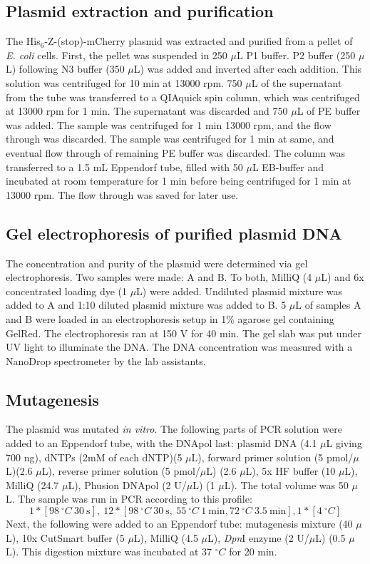 \documentclass[11pt,a4paper]{article}
\begin{document}
\subsection{Plasmid extraction and purification}
The His$_6$-Z-(stop)-mCherry plasmid was extracted and purified from a pellet of \textit{E. coli} cells. First, the pellet was suspended in 250 $\mu$L P1 buffer. P2 buffer (250 $\mu$L) following N3 buffer (350 $\mu$L) was added and inverted after each addition. This solution was centrifuged for 10 min at 13000 rpm. 750 $\mu$L of the supernatant from the tube was transferred to a QIAquick spin column, which was centrifuged at 13000 rpm for 1 min. The supernatant was discarded and 750 $\mu$L of PE buffer was added. The sample was centrifuged for 1 min 13000 rpm, and the flow through was discarded. The sample was centrifuged for 1 min at same, and eventual flow through of remaining PE buffer was discarded. The column was transferred to a 1.5 mL Eppendorf tube, filled with 50 $\mu$L EB-buffer and incubated at room temperature for 1 min before being centrifuged for 1 min at 13000 rpm. The flow through was saved for later use.

\subsection{Gel electrophoresis of purified plasmid DNA}

The concentration and purity of the plasmid were determined via gel electrophoresis. Two samples were made: A and B. To both, MilliQ (4 $\mu$L) and 6x concentrated loading dye (1 $\mu$L) were added. Undiluted plasmid mixture was added to A and 1:10 diluted plasmid mixture was added to B. 5 $\mu$L of samples A and B were loaded in an electrophoresis setup in 1\% agarose gel containing GelRed. The electrophoresis ran at 150 V for 40 min. The gel slab was put under UV light to illuminate the DNA. The DNA concentration was measured with a NanoDrop spectrometer by the lab assistants.

\subsection{Mutagenesis}
The plasmid was mutated \textit{in vitro}. The following parts of PCR solution were added to an Eppendorf tube, with the DNApol last: plasmid DNA (4.1 $\mu$L giving 700 ng), dNTPs (2mM of each dNTP)(5 $\mu$L), forward primer solution (5 pmol/$\mu$L)(2.6 $\mu$L), reverse primer solution (5 pmol/$\mu$L) (2.6 $\mu$L), 5x HF buffer (10 $\mu$L), MilliQ (24.7 $\mu$L), Phusion DNApol (2 U/$\mu$L) (1 $\mu$L). The total volume was 50 $\mu$L. The sample was run in PCR according to this profile: $$1*[98 \: ^{\circ}C \: 30 \: \textrm{s}], \: 12*[98 \: ^{\circ}C \: 30 \: \textrm{s}, \: 55 \: ^{\circ}C \: 1 \: \textrm{min}, 72 \: ^{\circ}C \: 3.5 \: \textrm{min}], 1*[4 \: ^{\circ}C]$$
Next, the following were added to an Eppendorf tube: mutagenesis mixture (40 $\mu$L), 10x CutSmart buffer (5 $\mu$L), MilliQ (4.5 $\mu$L), \textit{Dpn}I enzyme (2 U/$\mu$L) (0.5 $\mu$L). This digestion mixture was incubated at 37 $^\circ C$ for 20 min. 
\end{document}
